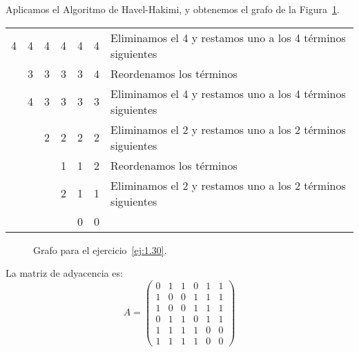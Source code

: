 \begin{ejercicio}
    Aplicamos el Algoritmo de Havel-Hakimi, y obtenemos el grafo de la Figura~\ref{fig:1.30_2}.
    \begin{table}[H]
        \centering
        \begin{tabular}{cccccc|l}
            4 & 4 & 4 & 4 & 4 & 4 & Eliminamos el 4 y restamos uno a los 4 términos siguientes\\
              & 3 & 3 & 3 & 3 & 4 & Reordenamos los términos\\
              & 4 & 3 & 3 & 3 & 3 & Eliminamos el 4 y restamos uno a los 4 términos siguientes\\
              &   & 2 & 2 & 2 & 2 & Eliminamos el 2 y restamos uno a los 2 términos siguientes\\
              &   &   & 1 & 1 & 2 & Reordenamos los términos\\
              &   &   & 2 & 1 & 1 & Eliminamos el 2 y restamos uno a los 2 términos siguientes\\
              &   &   &   & 0 & 0 &
        \end{tabular}
    \end{table}
    \begin{figure}
        \centering
        \caption{Grafo para el ejercicio~\ref{ej:1.30}.}
        \label{fig:1.30_2}
    \end{figure}

    La matriz de adyacencia es:
    \[
        A=\begin{pmatrix}
            0 & 1 & 1 & 0 & 1 & 1 \\
            1 & 0 & 0 & 1 & 1 & 1 \\
            1 & 0 & 0 & 1 & 1 & 1 \\
            0 & 1 & 1 & 0 & 1 & 1 \\
            1 & 1 & 1 & 1 & 0 & 0 \\
            1 & 1 & 1 & 1 & 0 & 0
        \end{pmatrix}
    \]


\end{ejercicio}
